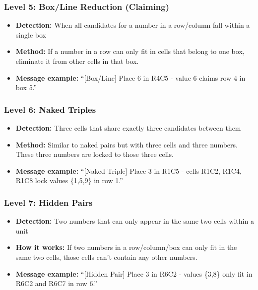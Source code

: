 \documentclass[12pt,a4paper]{article}
\begin{document}
\subsubsection*{Level 5: Box/Line Reduction (Claiming)}
\begin{itemize}
    \item \textbf{Detection:} When all candidates for a number in a row/column fall within a single box
    \item \textbf{Method:} If a number in a row can only fit in cells that belong to one box, eliminate it from other cells in that box.
    \item \textbf{Message example:} “[Box/Line] Place 6 in R4C5 - value 6 claims row 4 in box 5.”
\end{itemize}

\subsubsection*{Level 6: Naked Triples}
\begin{itemize}
    \item \textbf{Detection:} Three cells that share exactly three candidates between them
    \item \textbf{Method:} Similar to naked pairs but with three cells and three numbers. These three numbers are locked to those three cells.
    \item \textbf{Message example:} “[Naked Triple] Place 3 in R1C5 - cells R1C2, R1C4, R1C8 lock values \{1,5,9\} in row 1.”
\end{itemize}

\subsubsection*{Level 7: Hidden Pairs}
\begin{itemize}
    \item \textbf{Detection:} Two numbers that can only appear in the same two cells within a unit
    \item \textbf{How it works:} If two numbers in a row/column/box can only fit in the same two cells, those cells can't contain any other numbers.
    \item \textbf{Message example:} “[Hidden Pair] Place 3 in R6C2 - values \{3,8\} only fit in R6C2 and R6C7 in row 6.”
\end{itemize}
\end{document}
